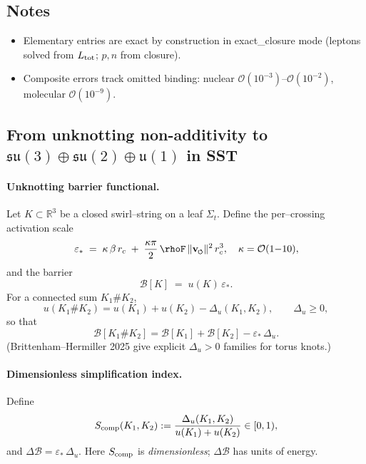 \documentclass[11pt]{article}
\begin{document}
\subsection*{Notes}
\begin{itemize}
\item Elementary entries are exact by construction in exact\_closure mode (leptons solved from $L_{\rm tot}$; $p,n$ from closure).
\item Composite errors track omitted binding: nuclear $\mathcal O(10^{-3})$–$\mathcal O(10^{-2})$, molecular $\mathcal O(10^{-9})$.
\end{itemize}


\subsection*{From unknotting non-additivity to \(\mathfrak{su}(3)\oplus\mathfrak{su}(2)\oplus\mathfrak u(1)\) in SST}

\paragraph{Unknotting barrier functional.}
    Let \(K\subset\mathbb R^3\) be a closed swirl–string on a leaf \(\Sigma_t\).
    Define the per–crossing activation scale
    \[
        \varepsilon_*\;=\;\kappa\,\beta\,\rc\;+\;\frac{\kappa\pi}{2}\,\rhoF\,\vnorm^2\,\rc^3,
        \quad \kappa=\mathcal O(1{-}10),
    \]
    and the barrier
    \[
        \mathcal B[K]\;=\;u(K)\,\varepsilon_*.
    \]
    For a connected sum \(K_1\#K_2\),
    \[
        u(K_1\#K_2)=u(K_1)+u(K_2)-\Delta_u(K_1,K_2),\qquad \Delta_u\ge 0,
    \]
    so that
    \[
        \mathcal B[K_1\#K_2]=\mathcal B[K_1]+\mathcal B[K_2]-\varepsilon_*\,\Delta_u.
    \]
    (Brittenham–Hermiller 2025 give explicit \(\Delta_u>0\) families for torus knots.)

\paragraph{Dimensionless simplification index.}
    Define
    \[
        S_{\rm comp}(K_1,K_2):=\frac{\Delta_u(K_1,K_2)}{u(K_1)+u(K_2)}\in[0,1),
    \]
    and \(\Delta\mathcal B=\varepsilon_*\,\Delta_u\). Here \(S_{\rm comp}\) is \emph{dimensionless}; \(\Delta\mathcal B\) has units of energy.
\end{document}
